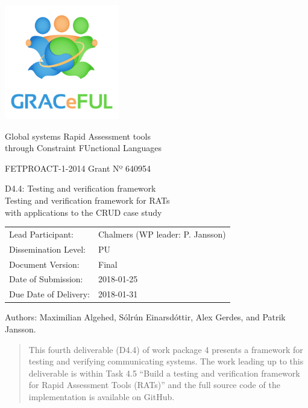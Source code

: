 \documentclass{article}
\author{}
\date{}
\begin{document}
\begin{center}
\includegraphics[width=5cm]{../coverpage/GRACeFULlogo.png}

\textcolor{GRACeFULblue}{Global systems Rapid Assessment tools\\
through Constraint FUnctional Languages}

\vspace{1cm}

FETPROACT-1-2014 Grant Nº 640954

\end{center}

\begin{framed}
\begin{center}
\Large
D4.4: Testing and verification framework\\[1ex]

\large
Testing and verification framework for RATs\\
with applications to the CRUD case study\\[1ex]

\end{center}
\end{framed}

\vspace{1cm}

\noindent
\begin{tabular}{@{}ll@{}}
  Lead Participant:       & Chalmers (WP leader: P. Jansson)
\\Dissemination Level:    & PU
\\Document Version:       & Final
\\Date of Submission:     & 2018-01-25
\\Due Date of Delivery:   & 2018-01-31
\end{tabular}

Authors: Maximilian Algehed, Sólrún Einarsdóttir, Alex Gerdes, and
Patrik Jansson.

\begin{abstract}

This fourth deliverable (D4.4) of work package 4 presents a framework for
testing and verifying communicating systems.
%
The work leading up to this deliverable is within Task 4.5 ``Build a
testing and verification framework for Rapid Assessment Tools (RATs)''
and the full source code of the implementation is available on GitHub.

\end{abstract}
\newpage
\end{document}
